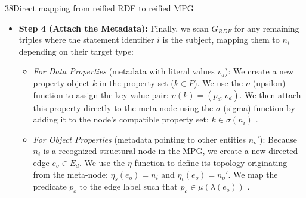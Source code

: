 \begin{question}{3}{8}{Direct mapping from reified RDF to reified MPG}
\begin{itemize}[leftmargin=*]
    \item \textbf{Step 4 (Attach the Metadata):} Finally, we scan $G_{RDF}$ for any remaining triples where the statement identifier $i$ is the subject, mapping them to $n_i$ depending on their target type:
    \begin{itemize}
        \item \textit{For Data Properties} (metadata with literal values $v_d$): We create a new property object $k$ in the property set ($k \in P$). We use the $\upsilon$ (upsilon) function to assign the key-value pair: $\upsilon(k) = (p_d, v_d)$. We then attach this property directly to the meta-node using the $\sigma$ (sigma) function by adding it to the node's compatible property set: $k \in \sigma(n_i)$ \cite{sadoughi_meta-property_2025}.
        \item \textit{For Object Properties} (metadata pointing to other entities $n_o'$): Because $n_i$ is a recognized structural node in the MPG, we create a new directed edge $e_o \in E_d$. We use the $\eta$ function to define its topology originating from the meta-node: $\eta_s(e_o) = n_i$ and $\eta_t(e_o) = n_o'$. We map the predicate $p_o$ to the edge label such that $p_o \in \mu(\lambda(e_o))$ \cite{sadoughi_meta-property_2025, hogan_knowledge_2022}.
    \end{itemize}
\end{itemize}

\end{question}